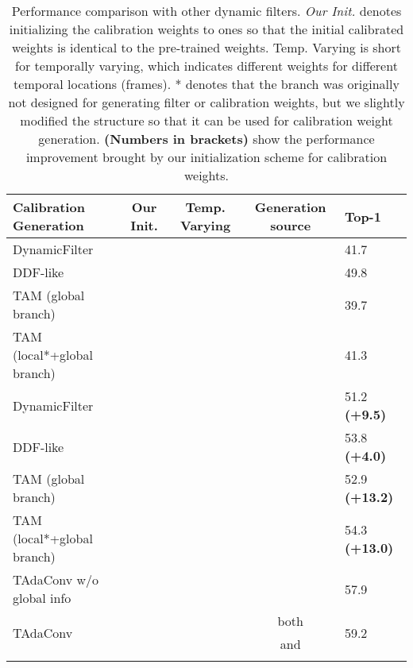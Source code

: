 \documentclass{article} \usepackage{iclr2022_conference,times}
\newcommand{\cmark}{\color{forestgreen}\ding{51}}\newcommand{\xmark}{\color{red}\ding{55}}\usepackage{pifont}
\newcommand{\tablestyle}[2]{\setlength{\tabcolsep}{#1}\renewcommand{\arraystretch}{#2}\centering\small}
\begin{document}
\begin{table}[]
    \tablestyle{5pt}{1.0}
\vspace{-1.5em}
\caption{{Performance comparison with other dynamic filters.
\textit{Our Init.} denotes initializing the calibration weights to ones so that the initial calibrated weights is identical to the pre-trained weights. Temp. Varying is short for temporally varying, which indicates different weights for different temporal locations (frames).
* denotes that the branch was originally not designed for generating filter or calibration weights, but we slightly modified the structure so that it can be used for calibration weight generation. \textbf{\color{forestgreen}(Numbers in brackets)} show the performance improvement brought by our initialization scheme for calibration weights.}
}
\centering
\begin{tabular}{lcccl}
\shline
\textbf{Calibration Generation} & \textbf{Our Init.} & \textbf{Temp. Varying} & \textbf{Generation source} & \textbf{Top-1} \\
\hline
DynamicFilter & \xmark & \xmark &  & 41.7 \\
DDF-like & \xmark & \cmark &  & 49.8 \\
TAM (global branch) & \xmark & \xmark &  & 39.7 \\
TAM (local*+global branch) & \xmark & \cmark &  & 41.3 \\
\hline
DynamicFilter & \cmark  & \xmark &  & 51.2 \textbf{\color{forestgreen}(+9.5)} \\
DDF-like & \cmark  & \cmark &  & 53.8 \textbf{\color{forestgreen}(+4.0)} \\
TAM (global branch) & \cmark & \xmark &  & 52.9 \textbf{\color{forestgreen}(+13.2)}\\
TAM (local*+global branch) & \cmark & \cmark &  & 54.3 \textbf{\color{forestgreen}(+13.0)}\\
\hline
TAdaConv w/o global info  & \cmark & \cmark &   & 57.9 \\
\hline
\multirow{2}{*}{TAdaConv} & \multirow{2}{*}{\cmark} & \multirow{2}{*}{\cmark} & both   & \multirow{2}{*}{59.2} \\
~ & ~ & ~ & and  & ~\\
\shline
\end{tabular}
\label{tab:compdyconvperf}
\end{table}
\end{document}
